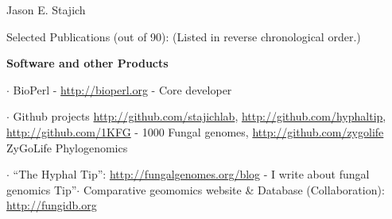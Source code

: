 \documentclass[10pt]{article}
\def\endthebibliography{\end{etaremune}}
\newlength{\oldcvlabelwidth}
\begin{document}
\begin{cv}{\centerline{Jason E. Stajich}}
\setlength{\oldcvlabelwidth}{\cvlabelwidth}
\setlength{\cvlabelwidth}{1em}
\renewcommand*{\bibindent}{1.5em}
\renewcommand*{\biblabelsep}{1.5em}


\makeatletter
\def\thebibliography#1{\list
{\arabic{enumiv}.}{\settowidth\labelwidth{[#1]}\leftmargin\labelwidth
\advance\leftmargin\labelsep
\usecounter{enumiv}}
\def\newblock{\hskip .11em plus .33em minus .07em}
\sloppy\clubpenalty4000\widowpenalty4000
\sfcode`\.=1000\relax
}
\let\endthebibliography=\endlist
\makeatother

\begin{cvlist}{Selected Publications (out of 90): (Listed in reverse chronological order.)}
\item 
  \def\mybibitem#1{\item}
  
\begin{cvlistcompact}{\bf Software and other Products}
  \item $\cdot$ BioPerl - \url{http://bioperl.org} - Core developer
\item  $\cdot$ Github projects \url{http://github.com/stajichlab},
  \url{http://github.com/hyphaltip}, \url{http://github.com/1KFG} - 1000 Fungal
   genomes, \url{http://github.com/zygolife} ZyGoLife Phylogenomics
\item $\cdot$ ``The Hyphal Tip'': \url{http://fungalgenomes.org/blog}
  - I write about fungal genomics
  Tip''$\cdot$ Comparative geomomics website \& Database (Collaboration): \url{http://fungidb.org}
\end{cvlistcompact}



\end{cvlist}
\end{cv}
\end{document}
